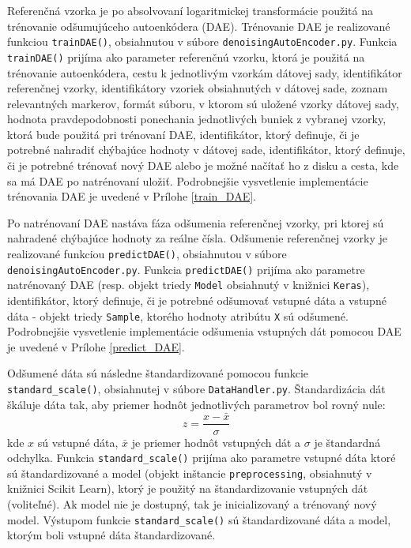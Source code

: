 Referenčná vzorka je po absolvovaní logaritmickej transformácie použitá na trénovanie odšumujúceho autoenkódera (DAE). Trénovanie DAE je realizované funkciou \texttt{trainDAE()}, obsiahnutou v súbore \texttt{denoisingAutoEncoder.py}. Funkcia \texttt{trainDAE()} prijíma ako parameter referenčnú vzorku, ktorá je použitá na trénovanie autoenkódera, cestu k jednotlivým vzorkám dátovej sady, identifikátor referenčnej vzorky, identifikátory vzoriek obsiahnutých v dátovej sade, zoznam relevantných markerov, formát súboru, v ktorom sú uložené vzorky dátovej sady, hodnota pravdepodobnosti ponechania jednotlivých buniek z vybranej vzorky, ktorá bude použitá pri trénovaní DAE, identifikátor, ktorý definuje, či je potrebné nahradiť chýbajúce hodnoty v dátovej sade, identifikátor, ktorý definuje, či je potrebné trénovať nový DAE alebo je možné načítať ho z disku a cesta, kde sa má DAE po natrénovaní uložiť. Podrobnejšie vysvetlenie implementácie trénovania DAE je uvedené v Prílohe \ref{train_DAE}. 

Po natrénovaní DAE nastáva fáza odšumenia referenčnej vzorky, pri ktorej sú nahradené chýbajúce hodnoty za reálne čísla. Odšumenie referenčnej vzorky je realizované funkciou \texttt{predictDAE()}, obsiahnutou v súbore \texttt{denoisingAutoEncoder.py}.  Funkcia \texttt{predictDAE()} prijíma ako parametre natrénovaný DAE (resp. objekt triedy \texttt{Model} obsiahnutý v knižnici \texttt{Keras}), identifikátor, ktorý definuje, či je potrebné odšumovať vstupné dáta a vstupné dáta - objekt triedy \texttt{Sample}, ktorého hodnoty atribútu \texttt{X} sú odšumené. Podrobnejšie vysvetlenie implementácie odšumenia vstupných dát pomocou DAE je uvedené v Prílohe \ref{predict_DAE}. 
 
Odšumené dáta sú následne štandardizované pomocou funkcie \texttt{standard_scale()}, obsiahnutej v súbore \texttt{DataHandler.py}. Štandardizácia dát škáluje dáta tak, aby priemer hodnôt jednotlivých parametrov bol rovný nule:
\[
z = \frac{x-\bar{x}}{\sigma}
\]
kde $x$ sú vstupné dáta, $\bar{x}$ je priemer hodnôt vstupných dát a $\sigma$ je štandardná odchylka. Funkcia \texttt{standard_scale()} prijíma ako parametre vstupné dáta ktoré sú štandardizované a model (objekt inštancie \texttt{preprocessing}, obsiahnutý v knižnici Scikit Learn), ktorý je použitý na štandardizovanie vstupných dát (voliteľné). Ak model nie je dostupný, tak je inicializovaný a trénovaný nový model. Výstupom funkcie \texttt{standard_scale()} sú štandardizované dáta a model, ktorým boli vstupné dáta štandardizované.

